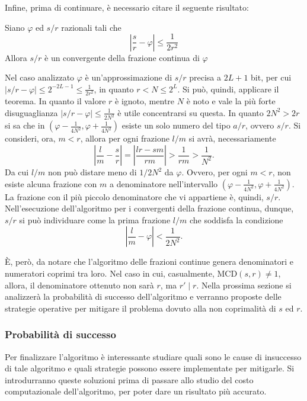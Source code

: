 Infine, prima di continuare, è necessario citare il seguente risultato:
\begin{thm}\label{thm:Cont_frac}
 Siano $\varphi$ ed $s/r$ razionali tali che
 \begin{equation}
  \left| \frac{s}{r} - \varphi \right| \leq \frac{1}{2r^2}
 \end{equation}
 Allora $s/r$ è un convergente della frazione continua di $\varphi$
\end{thm}
Nel caso analizzato $\varphi$ è un'approssimazione di $s/r$ precisa a $2L + 1$ bit, per cui $\left| s/r - \varphi \right| \leq 2^{-2L - 1} \leq \frac{1}{2r^2}$, in quanto $r < N \leq 2^L$.
Si può, quindi, applicare il teorema.
In quanto il valore $r$ è ignoto, mentre $N$ è noto e vale la più forte disuguaglianza $\left| s/r - \varphi \right| \leq \frac{1}{2N^2}$ è utile concentrarsi su questa.
In quanto $2N^2 > 2r$ si sa che in $\left(\varphi - \frac{1}{4N^2}, \varphi + \frac{1}{4N^2} \right)$ esiste un solo numero del tipo $a/r$, ovvero $s/r$.
Si consideri, ora, $m < r$, allora per ogni frazione $l/m$ si avrà, necessariamente
\begin{equation}
 \left| \frac{l}{m} -\frac{s}{r} \right| = \left| \frac{lr-sm}{rm} \right| > \frac{1}{rm} > \frac{1}{N^2}.
\end{equation}
Da cui $l/m$ non può distare meno di $1/2N^2$ da $\varphi$.
Ovvero, per ogni $m < r$, non esiste alcuna frazione con $m$ a denominatore nell'intervallo $\left(\varphi - \frac{1}{4N^2}, \varphi + \frac{1}{4N^2} \right)$.
La frazione con il più piccolo denominatore che vi appartiene è, quindi, $s/r$.
Nell'esecuzione dell'algoritmo per i convergenti della frazione continua, dunque, $s/r$ si può individuare come la prima frazione $l/m$ che soddisfa la condizione
\begin{equation}
  \left| \frac{l}{m} - \varphi \right| < \frac{1}{2N^2}.
\end{equation}

È, però, da notare che l'algoritmo delle frazioni continue genera denominatori e numeratori coprimi tra loro. Nel caso in cui, casualmente, MCD$(s,r) \neq 1$, allora, il denominatore ottenuto non sarà $r$, ma $r' \mid r$. 
Nella prossima sezione si analizzerà la probabilità di successo dell'algoritmo e verranno proposte delle strategie operative per mitigare il problema dovuto alla non coprimalità di $s$ ed $r$.

\subsubsection{Probabilità di successo}
Per finalizzare l'algoritmo è interessante studiare quali sono le cause di insuccesso di tale algoritmo e quali strategie possono essere implementate per mitigarle.
Si introdurranno queste soluzioni prima di passare allo studio del costo computazionale dell'algoritmo, per poter dare un risultato più accurato.

